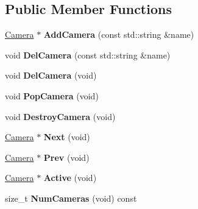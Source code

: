 \subsection*{Public Member Functions}
\begin{DoxyCompactItemize}
\item 
\hypertarget{class_cameras_a69dbe1e815608d4d89dd4f92a3da9740}{\hyperlink{class_camera}{Camera} $\ast$ {\bfseries Add\-Camera} (const std\-::string \&name)}\label{class_cameras_a69dbe1e815608d4d89dd4f92a3da9740}

\item 
\hypertarget{class_cameras_a4ecd9653534b1e109a12274fbc7ebc72}{void {\bfseries Del\-Camera} (const std\-::string \&name)}\label{class_cameras_a4ecd9653534b1e109a12274fbc7ebc72}

\item 
\hypertarget{class_cameras_ad8caa0ba1cad2443df7a76101ebd31a1}{void {\bfseries Del\-Camera} (void)}\label{class_cameras_ad8caa0ba1cad2443df7a76101ebd31a1}

\item 
\hypertarget{class_cameras_a621aab7852c787de21dd6f51c4b3335e}{void {\bfseries Pop\-Camera} (void)}\label{class_cameras_a621aab7852c787de21dd6f51c4b3335e}

\item 
\hypertarget{class_cameras_a671b9d5ba43cf8d3ed1aa6756139a358}{void {\bfseries Destroy\-Camera} (void)}\label{class_cameras_a671b9d5ba43cf8d3ed1aa6756139a358}

\item 
\hypertarget{class_cameras_a949ac4dc20db296cad912c68db9b853a}{\hyperlink{class_camera}{Camera} $\ast$ {\bfseries Next} (void)}\label{class_cameras_a949ac4dc20db296cad912c68db9b853a}

\item 
\hypertarget{class_cameras_aec8cddda5eb3605288d100236bbf0658}{\hyperlink{class_camera}{Camera} $\ast$ {\bfseries Prev} (void)}\label{class_cameras_aec8cddda5eb3605288d100236bbf0658}

\item 
\hypertarget{class_cameras_a84b0345c4b780212bd1a17b5f1c82511}{\hyperlink{class_camera}{Camera} $\ast$ {\bfseries Active} (void)}\label{class_cameras_a84b0345c4b780212bd1a17b5f1c82511}

\item 
\hypertarget{class_cameras_a098bd8d72ec6eae1e4e5eec27addf7ec}{size\-\_\-t {\bfseries Num\-Cameras} (void) const }\label{class_cameras_a098bd8d72ec6eae1e4e5eec27addf7ec}


\end{DoxyCompactItemize}
